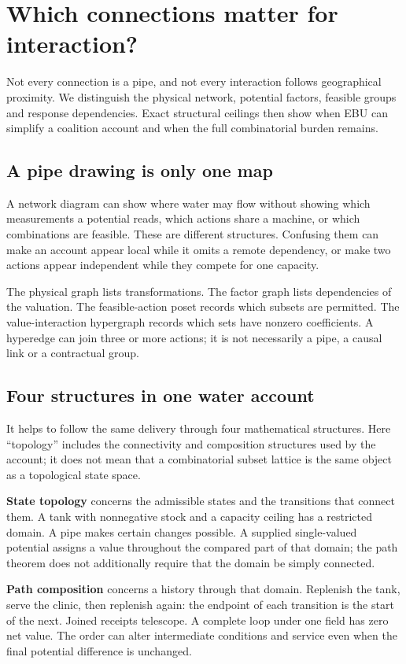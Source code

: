 \chapter{Which connections matter for interaction?}\label{ch:topology}

Not every connection is a pipe, and not every interaction follows geographical proximity. We distinguish the physical network, potential factors, feasible groups and response dependencies. Exact structural ceilings then show when EBU can simplify a coalition account and when the full combinatorial burden remains.


\section{A pipe drawing is only one map}
A network diagram can show where water may flow without showing which measurements a potential reads, which actions share a machine, or which combinations are feasible. These are different structures. Confusing them can make an account appear local while it omits a remote dependency, or make two actions appear independent while they compete for one capacity.

The physical graph lists transformations. The factor graph lists dependencies of the valuation. The feasible-action poset records which subsets are permitted. The value-interaction hypergraph records which sets have nonzero coefficients. A hyperedge can join three or more actions; it is not necessarily a pipe, a causal link or a contractual group.

\section{Four structures in one water account}
It helps to follow the same delivery through four mathematical structures. Here ``topology'' includes the connectivity and composition structures used by the account; it does not mean that a combinatorial subset lattice is the same object as a topological state space.

\textbf{State topology} concerns the admissible states and the transitions that connect them. A tank with nonnegative stock and a capacity ceiling has a restricted domain. A pipe makes certain changes possible. A supplied single-valued potential assigns a value throughout the compared part of that domain; the path theorem does not additionally require that the domain be simply connected.

\textbf{Path composition} concerns a history through that domain. Replenish the tank, serve the clinic, then replenish again: the endpoint of each transition is the start of the next. Joined receipts telescope. A complete loop under one field has zero net value. The order can alter intermediate conditions and service even when the final potential difference is unchanged.

